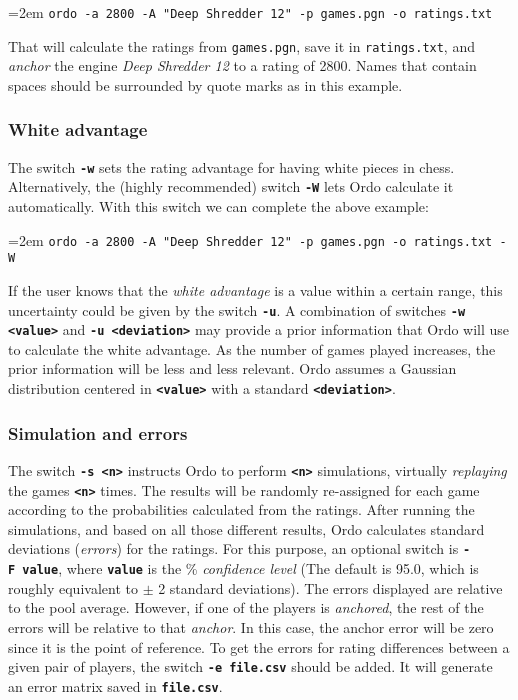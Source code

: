\documentclass[12pt]{article}
\newcommand{\swtch} [1] {\texttt{\textbf{#1}}}
\newcommand{\filename} [1] {\texttt{#1}}
\newcommand{\cmdln}[1]{
	\par
	\begingroup
		\leftskip=2em
		\addtolength{\rightskip}{0em}
		\noindent \small{\texttt{#1}}
		\par
	\endgroup
}
\begin{document}
	\cmdln{ordo -a 2800 -A "Deep Shredder 12" -p games.pgn -o ratings.txt}

That will calculate the ratings from \filename{games.pgn}, save it in \filename{ratings.txt}, and \textit{anchor} the engine \textit{Deep Shredder 12} to a rating of 2800.
Names that contain spaces should be surrounded by quote marks as in this example.

\subsubsection*{White advantage}
The switch \swtch{-w} sets the rating advantage for having white pieces in chess. 
Alternatively, the (highly recommended) switch \swtch{-W} lets Ordo calculate it automatically. 
With this switch we can complete the above example:

	\cmdln{ordo -a 2800 -A "Deep Shredder 12" -p games.pgn -o ratings.txt -W}

If the user knows that the \textit{white advantage} is a value within a certain range, this uncertainty could be given by the switch \swtch{-u}. 
A combination of switches \swtch{-w <value>} and \swtch{-u <deviation>} may provide a prior information that Ordo will use to calculate the white advantage.
As the number of games played increases, the prior information will be less and less relevant.
Ordo assumes a Gaussian distribution centered in \swtch{<value>} with a standard \swtch{<deviation>}.

\subsubsection*{Simulation and errors}

The switch \swtch{-s~<n>} instructs Ordo to perform \swtch{<n>} simulations, virtually \textit{replaying} the games \swtch{<n>} times.
The results will be randomly re-assigned for each game according to the probabilities calculated from the ratings. 
After running the simulations, and based on all those different results, Ordo calculates standard deviations (\textit{errors}) for the ratings.
For this purpose, an optional switch is \swtch{-F~value}, where \swtch{value} is the \% \textit{confidence level} (The default is 95.0, which is roughly equivalent to $\pm$ 2 standard deviations).
The errors displayed are relative to the pool average. 
However, if one of the players is \textit{anchored}, the rest of the errors will be relative to that \textit{anchor}.
In this case, the anchor error will be zero since it is the point of reference.
To get the errors for rating differences between a given pair of players, the switch \swtch{-e~file.csv} should be added.
It will generate an error matrix saved in \swtch{file.csv}.
\end{document}
